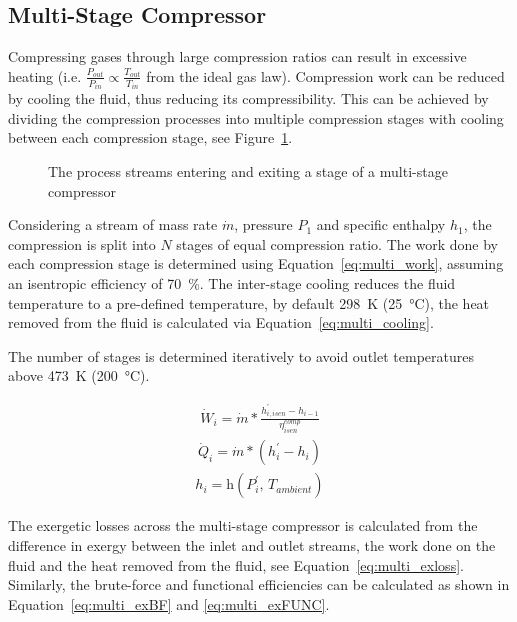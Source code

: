     \subsection{Multi-Stage Compressor}
        Compressing gases through large compression ratios can result in excessive heating (i.e. \(\frac{P_{out}}{P_{in}}\propto \frac{T_{out}}{T_{in}}\) from the ideal gas law). Compression work can be reduced by cooling the fluid, thus reducing its compressibility. This can be achieved by dividing the compression processes into multiple compression stages with cooling between each compression stage, see Figure~\ref{fig:multi_comp}.

        \begin{figure}[H]
            \centering
                            
            \caption{The process streams entering and exiting a stage of a multi-stage compressor}
            \label{fig:multi_comp}
        \end{figure}

        Considering a stream of mass rate \(\Dot{m}\), pressure \(P_1\) and specific enthalpy \(h_1\), the compression is split into \(N\) stages of equal compression ratio. The work done by each compression stage is determined using Equation~\ref{eq:multi_work}, assuming an isentropic efficiency of \qty{70}{\percent}. The inter-stage cooling reduces the fluid temperature to a pre-defined temperature, by default \qty{298}{\K} (\qty{25}{\degreeCelsius}), the heat removed from the fluid is calculated via Equation~\ref{eq:multi_cooling}.
        
        The number of stages is determined iteratively to avoid outlet temperatures above \qty{473}{\K} (\qty{200}{\degreeCelsius}).
        
        \begin{align} 
            \Dot{W}_i = \Dot{m} * \frac{h_{i, isen}^{'} - h_{i-1}}{\eta_{isen}^{comp}} \label{eq:multi_work}
        \end{align}
        \begin{align} 
            \Dot{Q}_i = \Dot{m} * (h_i^{'} - h_{i}) \label{eq:multi_cooling}
        \end{align}
        \begin{align}
            h_{i} = \textrm{h}(P_i^{'},\, T_{ambient}) \label{eq:inter_hout}
        \end{align}

        The exergetic losses across the multi-stage compressor is calculated from the difference in exergy between the inlet and outlet streams, the work done on the fluid and the heat removed from the fluid, see Equation~\ref{eq:multi_exloss}. Similarly, the brute-force and functional efficiencies can be calculated as shown in Equation~\ref{eq:multi_exBF} and \ref{eq:multi_exFUNC}.

